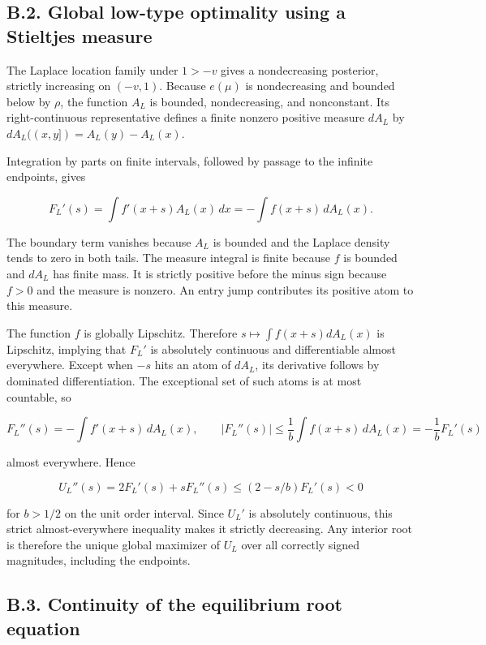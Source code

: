 \documentclass[
  11pt,
]{article}
\begin{document}
\subsection{B.2. Global low-type optimality using a Stieltjes
measure}\label{oa-b-concavity}

The Laplace location family under \(1>-v\) gives a nondecreasing
posterior, strictly increasing on \((-v,1)\). Because \(e(\mu)\) is
nondecreasing and bounded below by \(\rho\), the function \(A_L\) is
bounded, nondecreasing, and nonconstant. Its right-continuous
representative defines a finite nonzero positive measure \(dA_L\) by
\(dA_L((x,y])=A_L(y)-A_L(x)\).

Integration by parts on finite intervals, followed by passage to the
infinite endpoints, gives

\[
F_L'(s)=\int f'(x+s)A_L(x)\,dx=-\int f(x+s)\,dA_L(x).
\tag{OA.67}\label{eq:oa-oa-67}
\]

The boundary term vanishes because \(A_L\) is bounded and the Laplace
density tends to zero in both tails. The measure integral is finite
because \(f\) is bounded and \(dA_L\) has finite mass. It is strictly
positive before the minus sign because \(f>0\) and the measure is
nonzero. An entry jump contributes its positive atom to this measure.

The function \(f\) is globally Lipschitz. Therefore
\(s\mapsto\int f(x+s)dA_L(x)\) is Lipschitz, implying that \(F_L'\) is
absolutely continuous and differentiable almost everywhere. Except when
\(-s\) hits an atom of \(dA_L\), its derivative follows by dominated
differentiation. The exceptional set of such atoms is at most countable,
so

\[
F_L''(s)=-\int f'(x+s)\,dA_L(x),\qquad
|F_L''(s)|\le\frac1b\int f(x+s)\,dA_L(x)=-\frac1bF_L'(s)
\tag{OA.68}\label{eq:oa-oa-68}
\]

almost everywhere. Hence

\[
U_L''(s)=2F_L'(s)+sF_L''(s)
\le(2-s/b)F_L'(s)<0
\tag{OA.69}\label{eq:oa-oa-69}
\]

for \(b>1/2\) on the unit order interval. Since \(U_L'\) is absolutely
continuous, this strict almost-everywhere inequality makes it strictly
decreasing. Any interior root is therefore the unique global maximizer
of \(U_L\) over all correctly signed magnitudes, including the
endpoints.

\subsection{B.3. Continuity of the equilibrium root
equation}\label{oa-b-root}
\end{document}
